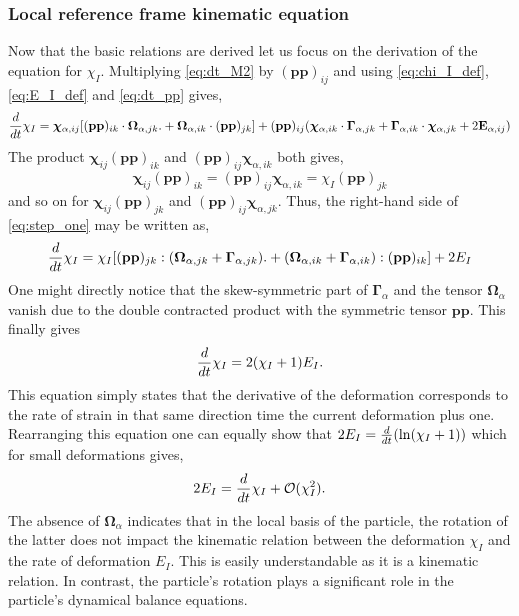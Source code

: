 \subsubsection{Local reference frame kinematic equation}

Now that the basic relations are derived let us focus on the derivation of the equation for $\chi_I$. 
Multiplying \ref{eq:dt_M2} by $(\textbf{pp})_{ij}$ and using \ref{eq:chi_I_def},\ref{eq:E_I_def} and  \ref{eq:dt_pp} gives, 
\begin{equation}
    \ddt \chi_I
    = 
    \bm\chi_{\alpha,ij} [(\textbf{pp})_{ik}\cdot\bm\Omega_{\alpha,jk}. 
    +\bm\Omega_{\alpha,ik}\cdot (\textbf{pp})_{jk}]
    + (\textbf{pp})_{ij}(\bm\chi_{\alpha,ik} \cdot \bm\Gamma_{\alpha,jk}
    + \bm\Gamma_{\alpha,ik} \cdot \bm\chi_{\alpha,jk}
    + 2\textbf{E}_{\alpha,ij})
    \label{eq:step_one}
\end{equation}
The product $\bm\chi_{ij} (\textbf{pp})_{ik}$ and $(\textbf{pp})_{ij}\bm\chi_{\alpha,ik}$ both gives, 
\begin{equation*}
    \bm\chi_{ij} (\textbf{pp})_{ik}
    =
    (\textbf{pp})_{ij}\bm\chi_{\alpha,ik}
    = 
    \chi_I (\textbf{pp})_{jk}
\end{equation*}
and so on for $\bm\chi_{ij} (\textbf{pp})_{jk}$ and $(\textbf{pp})_{ij} \bm\chi_{\alpha,jk}$. 
Thus, the right-hand side of \ref{eq:step_one} may be written as, 
\begin{equation}
    \ddt \chi_I
    = 
    \chi_I [(\textbf{pp})_{jk}:(\bm\Omega_{\alpha,jk} + \bm\Gamma_{\alpha,jk}). 
    +(\bm\Omega_{\alpha,ik} + \bm\Gamma_{\alpha,ik}) :(\textbf{pp})_{ik}]
    + 2E_I
    \label{eq:step_two}
\end{equation}
One might directly notice that the skew-symmetric part of $\bm\Gamma_\alpha$ and the tensor $\bm\Omega_\alpha$ vanish due to the double contracted product with the symmetric tensor $\textbf{pp}$. 
This finally gives 
\begin{equation}
    \ddt \chi_I
    = 
    2(\chi_I +1)E_I. 
    \label{eq:dt_chi_I}
\end{equation}
This equation simply states that the derivative of the deformation corresponds to the rate of strain in that same direction time the current deformation plus one.  
Rearranging this equation one can equally show that $2E_I = \frac{d}{dt} (\ln(\chi_I+1))$ which for small deformations gives,
\begin{equation}
    2E_I =  \ddt \chi_I + \mathcal{O}(\chi_I^2). 
    \label{eq:small_def}
\end{equation}
The absence of $\bm\Omega_\alpha$ indicates that in the local basis of the particle, the rotation of the latter does not impact the kinematic relation between the deformation $\chi_I$ and the rate of deformation $E_I$.
This is easily understandable as it is a kinematic relation. 
In contrast, the particle's rotation plays a significant role in the particle's dynamical balance equations.


